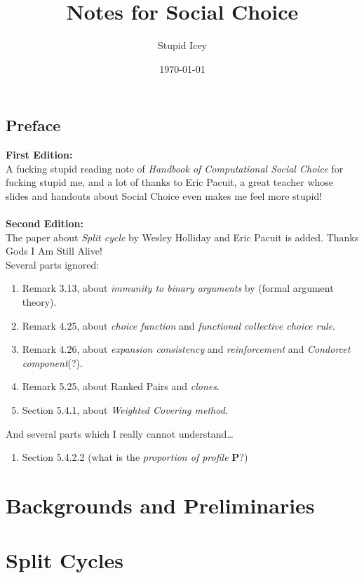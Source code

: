 \documentclass[a4paper,12pt,oneside]{book}
\title{Notes for Social Choice}
\author{Stupid Icey}
\date{\today}
\newcommand{\profile}{\mathbf{P}}
\begin{document}
\maketitle


\chapter*{Preface}

\textbf{First Edition:}\\
A fucking stupid reading note of \textit{Handbook of Computational Social Choice} \parencite{Moulin2016} for fucking stupid me, and a lot of thanks to Eric Pacuit, a great teacher whose slides and handouts about Social Choice even makes me feel more stupid!\\
~\\
\noindent \textbf{Second Edition:}\\
The paper about \emph{Split cycle} by Wesley Holliday and Eric Pacuit \parencite{Holliday2020} is added. Thanks Gods I Am Still Alive!\\
Several parts ignored:
\begin{enumerate}
  \item Remark 3.13, about \emph{immunity to binary arguments} by \textcite{Heitzig2002} (formal argument theory).
  \item Remark 4.25, about \emph{choice function} and \emph{functional collective choice rule}.
  \item Remark 4.26, about \emph{expansion consistency} and \emph{reinforcement} and \emph{Condorcet component}(?).
  \item Remark 5.25, about Ranked Pairs and \emph{clones}.
  \item Section 5.4.1, about \emph{Weighted Covering method}.
\end{enumerate}

\noindent And several parts which I really cannot understand\dots
\begin{enumerate}
  \item Section 5.4.2.2 (what is the \emph{proportion of profile} $\profile$?)
\end{enumerate}


\tableofcontents

\part{Backgrounds and Preliminaries}







\part{Split Cycles}





\printbibliography
\end{document}
